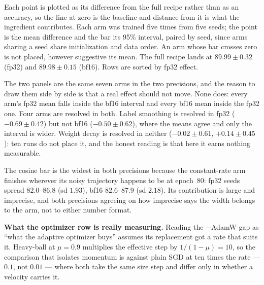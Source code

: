 \noindent Each point is plotted as its difference from the full recipe
rather than as an accuracy, so the line at zero is the baseline and distance
from it is what the ingredient contributes. Each arm was trained five times from
five seeds; the point is the mean difference and the bar its 95\% interval,
paired by seed, since arms sharing a seed share initialization and data order. An
arm whose bar crosses zero is not placed, however suggestive its mean. The full
recipe lands at $89.99 \pm 0.32$ (fp32) and $89.98 \pm 0.15$ (bf16). Rows are
sorted by fp32 effect.

\medskip\noindent The two panels are the same seven arms in the two precisions,
and the reason to draw them side by side is that a real effect should not
move. None does: every arm's fp32 mean falls inside the bf16 interval and every
bf16 mean inside the fp32 one. Four arms are resolved in both. Label smoothing is
resolved in fp32 ($-0.69 \pm 0.42$) but not bf16 ($-0.50 \pm 0.62$), where the
means agree and only the interval is wider. Weight decay is resolved in neither
($-0.02 \pm 0.61$, $+0.14 \pm 0.45$): ten runs do not place it, and the honest
reading is that here it earns nothing measurable.

\medskip\noindent The cosine bar is the widest in both precisions because the
constant-rate arm finishes wherever its noisy trajectory happens to be at
epoch~80: fp32 seeds spread $82.0$--$86.8$ (sd $1.93$), bf16 $82.6$--$87.9$
(sd $2.18$). Its contribution is large and imprecise, and both precisions
agreeing on how imprecise says the width belongs to the arm, not to
either number format.

\medskip\noindent \textbf{What the optimizer row is really measuring.} Reading
the $-$AdamW gap as ``what the adaptive optimizer buys'' assumes its replacement
got a rate that suits it. Heavy-ball at $\mu = 0.9$ multiplies the effective step
by $1/(1-\mu) = 10$, so the comparison that isolates momentum is against plain
SGD at ten times the rate --- $0.1$, not $0.01$ --- where both take the same size
step and differ only in whether a velocity carries it.

